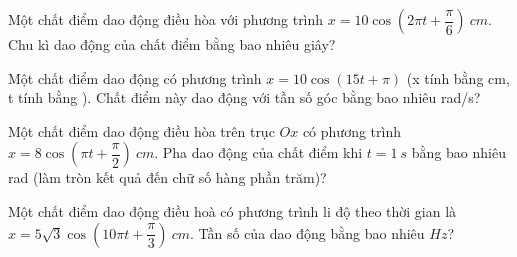 \begin{ex}
Một chất điểm dao động điều hòa với phương trình $x=10 \cos \left(2 \pi t+\dfrac{\pi}{6}\right)\ cm$. Chu kì dao động của chất điểm bằng bao nhiêu giây?
\end{ex} 

\begin{ex}
Một chất điểm dao động có phương trình $x=10 \cos (15 t+\pi)$ (x tính bằng cm, t tính bằng ). Chất điểm này dao động với tần số góc bằng bao nhiêu rad/s?
\end{ex} 
\begin{ex}
Một chất điểm dao động điều hòa trên trục $Ox$ có phương trình $x=8 \cos \left(\pi t+\dfrac{\pi}{2}\right)\ cm$. Pha dao động của chất điểm khi $t=1 \ s$ bằng bao nhiêu rad (làm tròn kết quả đến chữ số hàng phần trăm)?
\end{ex} 
\begin{ex}
Một chất điểm dao động điều hoà có phương trình li độ theo thời gian là $x=5 \sqrt{3} \cos \left(10 \pi t+\dfrac{\pi}{3}\right)\ cm$. Tần số của dao động bằng bao nhiêu $Hz$?
\end{ex} 
